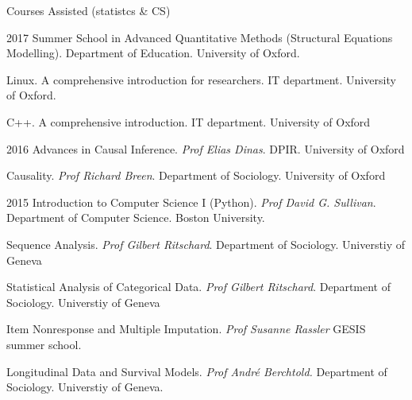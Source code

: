 \documentclass[12pt,a4paper]{article}
\begin{document}
	\begin{cv}{Courses Assisted (statistcs \& CS)}

		\begin{cvlist}{}
			
			\item[2017] Summer School in Advanced
			Quantitative Methods (Structural Equations Modelling). Department of Education. University of Oxford. 
				
			\item[] Linux. A comprehensive introduction for researchers. IT department. University of Oxford. 
			
			\item[] C++. A comprehensive introduction. IT department. University of Oxford
				
			\item[2016] Advances in Causal Inference. \emph{Prof Elias Dinas}. DPIR. University of Oxford
					
			\item[] Causality. \emph{Prof Richard Breen}. Department of Sociology. University of Oxford
								
			\item[2015] Introduction to
			Computer Science I (Python). \emph{Prof David G. Sullivan}. Department of Computer Science. Boston University. 
					
			\item[] Sequence Analysis. \emph{Prof Gilbert Ritschard}. Department of Sociology. Universtiy of Geneva
			
			\item[] Statistical Analysis of Categorical Data. \emph{Prof Gilbert Ritschard}. Department of Sociology. Universtiy of Geneva
			
			\item[] Item Nonresponse and Multiple Imputation. \emph{Prof Susanne R{a}ssler} GESIS summer school. 
			
			\item[] Longitudinal Data and Survival Models. \emph{Prof Andr{\'e} Berchtold.} Department of Sociology. Universtiy of Geneva. 		
											
		\end{cvlist} 

  \date{~June~2017}
\end{cv}
\end{document}
